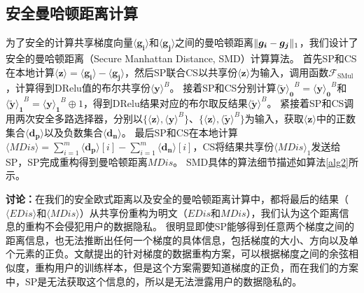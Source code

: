 \subsection{安全曼哈顿距离计算}\label{smd}
为了安全的计算共享梯度向量$\boldsymbol{\langle g_i\rangle}$和$\boldsymbol{\langle g_j\rangle}$之间的曼哈顿距离$\Vert \boldsymbol{g_i} - \boldsymbol{g_j}\Vert_1$，我们设计了安全的曼哈顿距离（Secure Manhattan Distance, SMD）计算算法。
首先SP和CS在本地计算$\boldsymbol{\langle z\rangle} = \boldsymbol{\langle g_i\rangle} - \boldsymbol{\langle g_j\rangle}$，然后SP联合CS以共享份$\boldsymbol{\langle z\rangle}$为输入，调用函数$\mathcal{F}_{\text {SMul}}$，计算得到DRelu值的布尔共享份$\boldsymbol{\langle y\rangle}^{B}$。
接着SP和CS分别计算$\boldsymbol{\langle \widetilde{y} \rangle_0}^{B} = \boldsymbol{\langle y\rangle_0}^{B}$和$\boldsymbol{\langle \widetilde{y} \rangle_1}^{B} = \boldsymbol{\langle y\rangle_1}^{B} \oplus 1$，得到DRelu结果对应的布尔取反结果$\boldsymbol{\langle \widetilde{y} \rangle}^{B}$。
紧接着SP和CS调用两次安全多路选择器，分别以$\{\boldsymbol{\langle z\rangle}, \boldsymbol{\langle y\rangle}^{B}\}$、$\{\boldsymbol{\langle z\rangle}, \boldsymbol{\langle \widetilde{y}\rangle}^{B}\}$为输入，获取$\boldsymbol{\langle z\rangle}$中的正数集合$\boldsymbol{
	\langle d_p\rangle}$以及负数集合$\boldsymbol{
	\langle d_n\rangle}$。
最后SP和CS在本地计算$\langle \textit{MDis}\rangle = \sum_{i=1}^{m}\boldsymbol{\langle d_p\rangle}[i] - \sum_{i=1}^{m}\boldsymbol{\langle d_n\rangle}[i]$，CS将结果共享份$\langle \textit{MDis}\rangle_1$发送给SP，SP完成重构得到曼哈顿距离$\textit{MDis}$。
SMD具体的算法细节描述如算法\ref{alg2}所示。

\textbf{讨论：}在我们的安全欧式距离以及安全的曼哈顿距离计算中，都将最后的结果（$\langle \textit{EDis}\rangle$和$\langle \textit{MDis}\rangle$）从共享份重构为明文（$\textit{EDis}$和$\textit{MDis}$），我们认为这个距离信息的重构不会侵犯用户的数据隐私。
很明显即使SP能够得到任意两个梯度之间的距离信息，也无法推断出任何一个梯度的具体信息，包括梯度的大小、方向以及单个元素的正负。文献\cite{geiping2020inverting}提出的针对梯度的数据重构方案，可以根据梯度之间的余弦相似度，重构用户的训练样本，但是这个方案需要知道梯度的正负，而在我们的方案中，SP是无法获取这个信息的，所以是无法泄露用户的数据隐私的。

